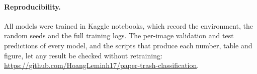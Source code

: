 \documentclass[runningheads]{llncs}
\begin{document}
\paragraph{Reproducibility.}
All models were trained in Kaggle notebooks, which record the environment,
the random seeds and the full training logs. The per-image validation and test
predictions of every model, and the scripts that produce each number, table and
figure, let any result be checked without retraining: \url{https://github.com/HoangLeminh17/paper-trash-classification}.



\end{document}

